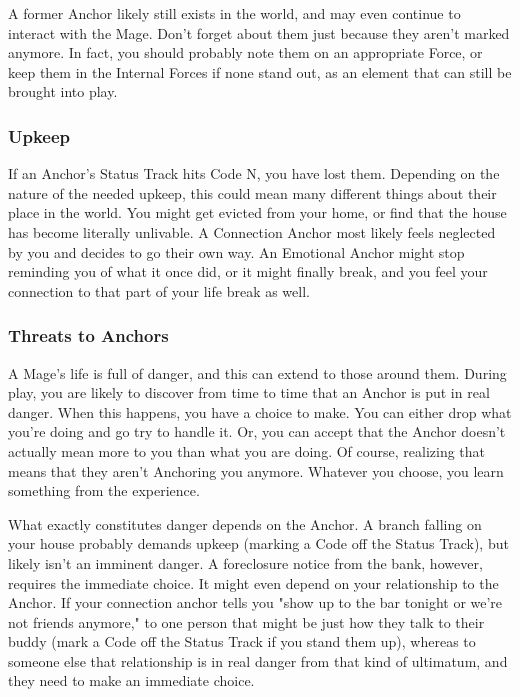 \documentclass[
  oneside,
  statementpaper,
  9pt]{memoir}
\begin{document}
\begin{MC}

A former Anchor likely still exists in the world, and may even continue to interact with the Mage. Don’t forget about them just because they aren’t marked anymore. In fact, you should probably note them on an appropriate Force, or keep them in the Internal Forces if none stand out, as an element that can still be brought into play.

\end{MC}

\hypertarget{upkeep}{%
\subsubsection{Upkeep}\label{upkeep}}

\begin{Player}

If an Anchor’s Status Track hits Code N, you have lost them. Depending on the nature of the needed upkeep, this could mean many different things about their place in the world. You might get evicted from your home, or find that the house has become literally unlivable. A Connection Anchor most likely feels neglected by you and decides to go their own way. An Emotional Anchor might stop reminding you of what it once did, or it might finally break, and you feel your connection to that part of your life break as well.

\end{Player}

\hypertarget{threats-to-anchors}{%
\subsubsection{Threats to Anchors}\label{threats-to-anchors}}

\begin{Player}

A Mage’s life is full of danger, and this can extend to those around them. During play, you are likely to discover from time to time that an Anchor is put in real danger. When this happens, you have a choice to make. You can either drop what you’re doing and go try to handle it. Or, you can accept that the Anchor doesn’t actually mean more to you than what you are doing. Of course, realizing that means that they aren’t Anchoring you anymore. Whatever you choose, you learn something from the experience.

What exactly constitutes danger depends on the Anchor. A branch falling on your house probably demands upkeep (marking a Code off the Status Track), but likely isn’t an imminent danger. A foreclosure notice from the bank, however, requires the immediate choice. It might even depend on your relationship to the Anchor. If your connection anchor tells you "show up to the bar tonight or we’re not friends anymore," to one person that might be just how they talk to their buddy (mark a Code off the Status Track if you stand them up), whereas to someone else that relationship is in real danger from that kind of ultimatum, and they need to make an immediate choice.

\end{Player}
\end{document}
